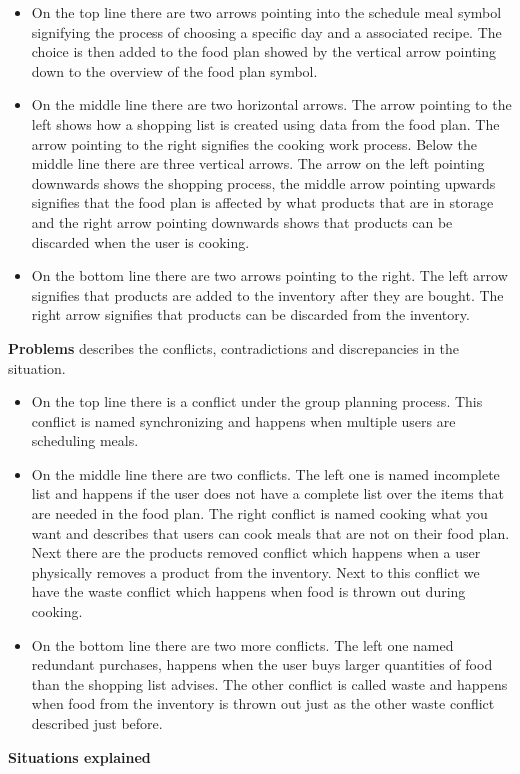 \begin{itemize}
\item On the top line there are two arrows pointing into the schedule meal symbol signifying the process of choosing a specific day and a associated recipe. The choice is then added to the food plan showed by the vertical arrow pointing down to the overview of the food plan symbol. 

\item On the middle line there are two horizontal arrows. The arrow pointing to the left shows how a shopping list is created using data from the food plan. The arrow pointing to the right signifies the cooking work process. Below the middle line there are three vertical arrows. The arrow on the left pointing downwards shows the shopping process, the middle arrow pointing upwards signifies that the food plan is affected by what products that are in storage and the right arrow pointing downwards shows that products can be discarded when the user is cooking. 

\item On the bottom line there are two arrows pointing to the right. The left arrow signifies that products are added to the inventory after they are bought. The right arrow signifies that products can be discarded from the inventory.            
\end{itemize}
\textbf{Problems} describes the conflicts, contradictions and discrepancies in the situation.
\begin{itemize}
\item On the top line there is a conflict under the group planning process. This conflict is named synchronizing and happens when multiple users are scheduling meals. 

\item On the middle line there are two conflicts. The left one is named incomplete list and happens if the user does not have a complete list over the items that are needed in the food plan. The right conflict is named cooking what you want and describes that users can cook meals that are not on their food plan. Next there are the products removed conflict which happens when a user physically removes a product from the inventory. Next to this conflict we have the waste conflict which happens when food is thrown out during cooking.  

\item On the bottom line there are two more conflicts. The left one named redundant purchases, happens when the user buys larger quantities of food than the shopping list advises. The other conflict is called waste and happens when food from the inventory is thrown out just as the other waste conflict described just before.           
\end{itemize}
\textbf{Situations explained}

